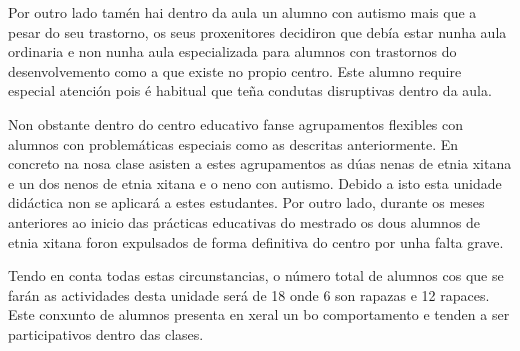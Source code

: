 Por outro lado tamén hai dentro da aula un alumno con autismo mais que a pesar do seu trastorno, os seus proxenitores decidiron que debía estar nunha aula ordinaria e non nunha aula especializada para alumnos con trastornos do desenvolvemento como a que existe no propio centro. Este alumno require especial atención pois é habitual que teña condutas disruptivas dentro da aula.

Non obstante dentro do centro educativo fanse agrupamentos flexibles con alumnos con problemáticas especiais como as descritas anteriormente. En concreto na nosa clase asisten a estes agrupamentos as dúas nenas de etnia xitana e un dos nenos de etnia xitana e o neno con autismo. Debido a isto esta unidade didáctica non se aplicará a estes estudantes. Por outro lado, durante os meses anteriores ao inicio das prácticas educativas do mestrado os dous alumnos de etnia xitana foron expulsados de forma definitiva do centro por unha falta grave.

Tendo en conta todas estas circunstancias, o número total de alumnos cos que se farán as actividades desta unidade será de 18 onde 6 son rapazas e 12 rapaces. Este conxunto de alumnos presenta en xeral un bo comportamento e tenden a ser participativos dentro das clases.
